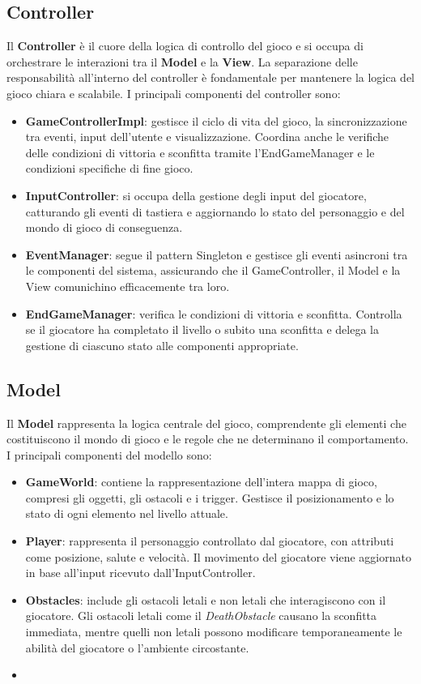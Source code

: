 \documentclass[a4paper,12pt]{report}
\begin{document}
\subsection{Controller}

Il \textbf{Controller} è il cuore della logica di controllo del gioco e si occupa di orchestrare le interazioni tra il \textbf{Model} e la \textbf{View}. La separazione delle responsabilità all'interno del controller è fondamentale per mantenere la logica del gioco chiara e scalabile. I principali componenti del controller sono:

\begin{itemize} \item \textbf{GameControllerImpl}: gestisce il ciclo di vita del gioco, la sincronizzazione tra eventi, input dell’utente e visualizzazione. Coordina anche le verifiche delle condizioni di vittoria e sconfitta tramite l'EndGameManager e le condizioni specifiche di fine gioco. \item \textbf{InputController}: si occupa della gestione degli input del giocatore, catturando gli eventi di tastiera e aggiornando lo stato del personaggio e del mondo di gioco di conseguenza. \item \textbf{EventManager}: segue il pattern Singleton e gestisce gli eventi asincroni tra le componenti del sistema, assicurando che il GameController, il Model e la View comunichino efficacemente tra loro. \item \textbf{EndGameManager}: verifica le condizioni di vittoria e sconfitta. Controlla se il giocatore ha completato il livello o subito una sconfitta e delega la gestione di ciascuno stato alle componenti appropriate. \end{itemize}

\subsection{Model}

Il \textbf{Model} rappresenta la logica centrale del gioco, comprendente gli elementi che costituiscono il mondo di gioco e le regole che ne determinano il comportamento. I principali componenti del modello sono:

\begin{itemize} \item \textbf{GameWorld}: contiene la rappresentazione dell’intera mappa di gioco, compresi gli oggetti, gli ostacoli e i trigger. Gestisce il posizionamento e lo stato di ogni elemento nel livello attuale. \item \textbf{Player}: rappresenta il personaggio controllato dal giocatore, con attributi come posizione, salute e velocità. Il movimento del giocatore viene aggiornato in base all’input ricevuto dall’InputController. \item \textbf{Obstacles}: include gli ostacoli letali e non letali che interagiscono con il giocatore. Gli ostacoli letali come il \textit{DeathObstacle} causano la sconfitta immediata, mentre quelli non letali possono modificare temporaneamente le abilità del giocatore o l’ambiente circostante. \item  \end{itemize}
\end{document}
